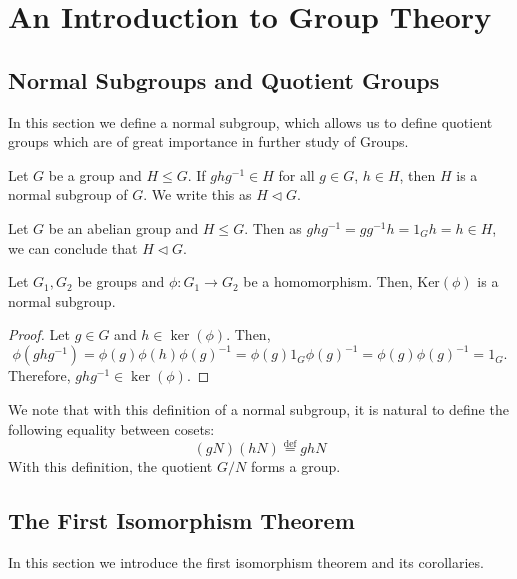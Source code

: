 \chapter[Group Theory]{An Introduction to Group Theory}
\section{Normal Subgroups and Quotient Groups}

In this section we define a normal subgroup, which allows us to define quotient groups which are of great importance in further study of Groups.

\begin{definition}
  Let $G$ be a group and $H \leq G$. If $ghg^{-1} \in H$ for all $g \in G$, $h \in H$, then $H$ is a normal subgroup of $G$. We write this as $H \lhd G$.
\end{definition}

\begin{example}
  Let $G$ be an abelian group and $H \leq G$. Then as $ghg^{-1}=gg^{-1}h=1_Gh=h \in H$, we can conclude that $H \lhd G$.  
\end{example}

\begin{theorem}
  Let $G_1, G_2$ be groups and $\phi : G_1 \rightarrow G_2$ be a homomorphism. Then, $\text{Ker}(\phi)$ is a normal subgroup.
\end{theorem}
\begin{proof}
  Let \( g \in G \) and \( h \in \ker(\phi) \). Then,
  \[
    \phi(ghg^{-1}) = \phi(g)\phi(h)\phi(g)^{-1} = \phi(g)1_G\phi(g)^{-1} = \phi(g)\phi(g)^{-1} = 1_G.
  \]
  Therefore, \( ghg^{-1} \in \ker(\phi) \).
\end{proof}

We note that with this definition of a normal subgroup, it is natural to define the following equality between cosets:
\[
  (gN)(hN)\overset{\text{def}}{=}ghN
\]
With this definition, the quotient $G/N$ forms a group.

\section{The First Isomorphism Theorem}

In this section we introduce the first isomorphism theorem and its corollaries.


